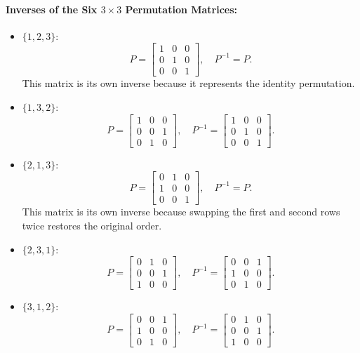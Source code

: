\documentclass{article}
\begin{document}
\paragraph{Inverses of the Six $3 \times 3$ Permutation Matrices:}
\begin{itemize}
    \item $\{1, 2, 3\}$:
    \[
    P = \begin{bmatrix}
    1 & 0 & 0 \\
    0 & 1 & 0 \\
    0 & 0 & 1
    \end{bmatrix}, \quad P^{-1} = P.
    \]
    This matrix is its own inverse because it represents the identity permutation.

    \item $\{1, 3, 2\}$:
    \[
    P = \begin{bmatrix}
    1 & 0 & 0 \\
    0 & 0 & 1 \\
    0 & 1 & 0
    \end{bmatrix}, \quad P^{-1} = \begin{bmatrix}
    1 & 0 & 0 \\
    0 & 1 & 0 \\
    0 & 0 & 1
    \end{bmatrix}.
    \]

    \item $\{2, 1, 3\}$:
    \[
    P = \begin{bmatrix}
    0 & 1 & 0 \\
    1 & 0 & 0 \\
    0 & 0 & 1
    \end{bmatrix}, \quad P^{-1} = P.
    \]
    This matrix is its own inverse because swapping the first and second rows twice restores the original order.

    \item $\{2, 3, 1\}$:
    \[
    P = \begin{bmatrix}
    0 & 1 & 0 \\
    0 & 0 & 1 \\
    1 & 0 & 0
    \end{bmatrix}, \quad P^{-1} = \begin{bmatrix}
    0 & 0 & 1 \\
    1 & 0 & 0 \\
    0 & 1 & 0
    \end{bmatrix}.
    \]

    \item $\{3, 1, 2\}$:
    \[
    P = \begin{bmatrix}
    0 & 0 & 1 \\
    1 & 0 & 0 \\
    0 & 1 & 0
    \end{bmatrix}, \quad P^{-1} = \begin{bmatrix}
    0 & 1 & 0 \\
    0 & 0 & 1 \\
    1 & 0 & 0
    \end{bmatrix}.
    \]


\end{itemize}
\end{document}
